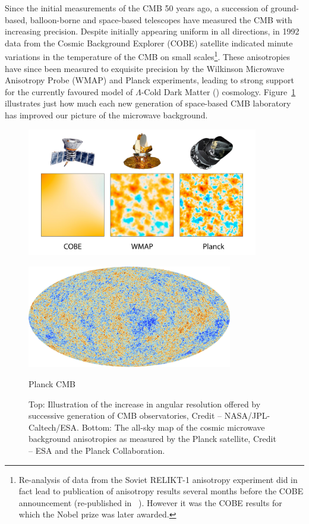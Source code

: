 Since the initial measurements of the CMB 50 years ago, a succession of ground-based, balloon-borne and space-based telescopes have measured the CMB with increasing precision. Despite initially appearing uniform in all directions, in 1992 data from the Cosmic Background Explorer (COBE) satellite indicated minute variations in the temperature of the CMB on small scales\footnote{Re-analysis of data from the Soviet RELIKT-1 anisotropy experiment did in fact lead to publication of anisotropy results several months before the COBE announcement (re-published in \citeauthor{Strukov:1992ua}~\citeyear{Strukov:1992ua}). However it was the COBE results for which the Nobel prize was later awarded.}. These anisotropies have since been measured to exquisite precision by the Wilkinson Microwave Anisotropy Probe (WMAP) and Planck experiments, leading to strong support for the currently favoured model of $\Lambda$-Cold Dark Matter (\cdm{}) cosmology. Figure~\ref{fig:cmb_comparison} illustrates just how much each new generation of space-based CMB laboratory has improved our picture of the microwave background.

\begin{figure}[!hb]
	\centering
	\includegraphics[width=0.9\textwidth]{CobeWmapPlanckComparison.jpg}\label{fig:cmb_comparison}

	\vspace{0.5in}
		
	\includegraphics[width=0.8\textwidth]{Planck_CMB.jpg}
	
	{\sffamily Planck CMB}
	\caption[The Cosmic Microwave Background anisotropy.]{Top: Illustration of the increase in angular resolution offered by successive generation of CMB observatories, Credit -- NASA/JPL-Caltech/ESA. Bottom: The all-sky map of the cosmic microwave background anisotropies as measured by the Planck satellite, Credit -- ESA and the Planck Collaboration.}
\end{figure}

